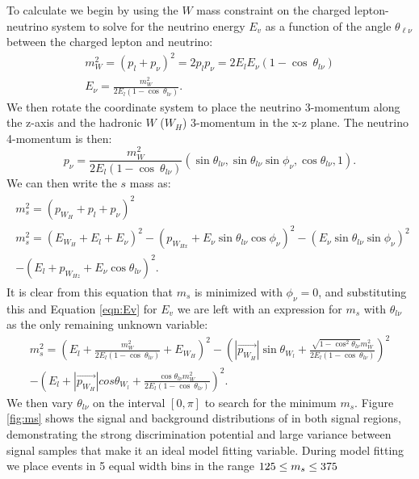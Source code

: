 To calculate \minms we begin by using the $W$ mass constraint on the charged lepton-neutrino system to solve for the neutrino energy $E_v$ as a function of the angle $\theta_{\ell\nu}$ between the charged lepton and neutrino:
\begin{equation}
	\begin{gathered}
    \label{eqn:Ev}
		m_W^2 = (p_l + p_{\nu})^2 = 2p_lp_{\nu} = 2E_lE_{\nu}(1 - \cos\ \theta_{l\nu})\\
		E_{\nu} = \frac{m_W^2}{2E_l(1 - \cos\ \theta_{l\nu})}.
	\end{gathered}
\end{equation}
We then rotate the coordinate system to place the neutrino 3-momentum along the z-axis and the hadronic $W$ ($W_H$) 3-momentum in the x-z plane. The neutrino 4-momentum is then:
\begin{equation}
	p_{\nu} = \frac{m_W^2}{2E_l(1 - \cos\ \theta_{l\nu})}(\sin \theta_{l\nu}, \sin \theta_{l\nu}\sin \phi_{\nu}, \cos \theta_{l\nu}, 1).
\end{equation}
We can then write the $s$ mass as:
\begin{multline}
\label{eqn:m_s}
	\begin{gathered}
		m_s^2 = (p_{W_H} + p_l + p_{\nu})^2\\
		m_s^2 = (E_{W_H} + E_l + E_{\nu})^2 - (p_{W_{Hx}} + E_{\nu}\sin \theta_{l\nu}\cos \phi_{\nu})^2 - (E_{\nu}\sin \theta_{l\nu}\sin \phi_{\nu})^2 \\- (E_l + p_{W_{Hz}} + E_{\nu}\cos \theta_{l\nu})^2.
	\end{gathered}
\end{multline}
It is clear from this equation that $m_s$ is minimized with $\phi_{\nu} = 0$, and substituting this and Equation \ref{eqn:Ev} for $E_v$ we are left with an expression for $m_s$ with $\theta_{l\nu}$ as the only remaining unknown variable:
\begin{multline}
m_s^2 = \left(E_l + \frac{m_W^2}{2E_l(1 - \cos\ \theta_{l\nu})} + E_{W_H}\right)^2 - \left(|\vec{p_{W_H}}|\sin \theta_{W_l} + \frac{\sqrt{1 - \cos^2 \theta_{l\nu}}m_W^2}{2E_l(1 - \cos\ \theta_{l\nu})}\right)^2 \\- \left(E_l + |\vec{p_{W_H}}|cos \theta_{W_l} + \frac{\cos \theta_{l\nu}m_W^2}{2E_l(1 - \cos\ \theta_{l\nu})}\right)^2.
\end{multline}
We then vary $\theta_{l\nu}$ on the interval $[0,\pi]$ to search for the minimum $m_s$.
Figure \ref{fig:ms} shows the signal and background distributions of \minms in both signal regions, demonstrating the strong discrimination potential and large variance between signal samples that make it an ideal model fitting variable. During model fitting we place events in 5 equal width bins in the range $125 \leq m_s \leq 375$

